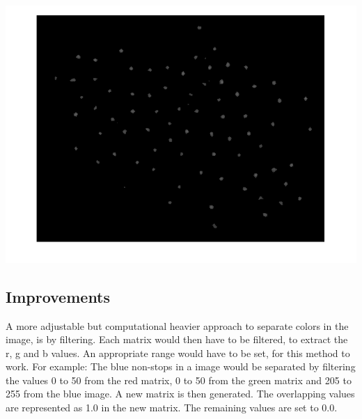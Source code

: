 \centerline{\includegraphics[scale=0.3]{dots.png}}
\subsection{Improvements}
A more adjustable but computational heavier approach to separate colors in the image, is by filtering. Each matrix would then have to be filtered, to extract the r, g and b values. An appropriate range would have to be set, for this method to work. For example: The blue non-stops in a image would be separated by filtering the values 0 to 50 from the red matrix, 0 to 50 from the green matrix and 205 to 255 from the blue image. A new matrix is then generated. The overlapping values are represented as 1.0 in the new matrix. The remaining values are set to 0.0.\\

